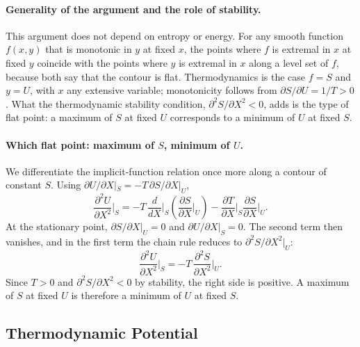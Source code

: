 \paragraph{Generality of the argument and the role of stability.}
This argument does not depend on entropy or energy. For any smooth function
$f(x,y)$ that is monotonic in $y$ at fixed $x$, the points where $f$ is
extremal in $x$ at fixed $y$ coincide with the points where $y$ is extremal
in $x$ along a level set of $f$, because both say that the contour is flat.
Thermodynamics is the case $f=S$ and $y=U$, with $x$ any extensive variable;
monotonicity follows from $\partial S/\partial U=1/T>0$. What the
thermodynamic stability condition, $\partial^2S/\partial X^2<0$, adds is the
type of flat point: a maximum of $S$ at fixed $U$ corresponds to a minimum of
$U$ at fixed $S$.

\paragraph{Which flat point: maximum of $S$, minimum of $U$.}
We differentiate the implicit-function relation once more along a contour of
constant $S$. Using $\partial U/\partial X|_S=-T\,\partial S/\partial X|_U$,
\begin{equation*}
    \frac{\partial^2U}{\partial X^2}\bigg|_S
    =-T\,\frac{d}{dX}\bigg|_S\left(\frac{\partial S}{\partial X}\bigg|_U\right)
    -\frac{\partial T}{\partial X}\bigg|_S\frac{\partial S}{\partial X}\bigg|_U.
\end{equation*}
At the stationary point, $\partial S/\partial X|_U=0$ and
$\partial U/\partial X|_S=0$. The second term then vanishes, and in the first
term the chain rule reduces to $\partial^2S/\partial X^2|_U$:
\begin{equation}
    \boxed{\frac{\partial^2U}{\partial X^2}\bigg|_S
    =-T\,\frac{\partial^2S}{\partial X^2}\bigg|_U.}
\end{equation}
Since $T>0$ and $\partial^2S/\partial X^2<0$ by stability, the right side is
positive. A maximum of $S$ at fixed $U$ is therefore a minimum of $U$ at
fixed $S$.

\subsection{Thermodynamic Potential}


